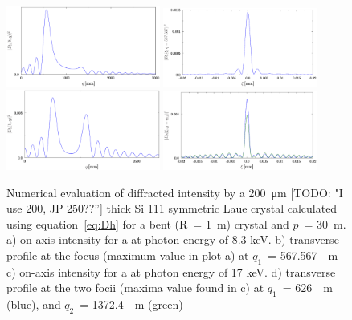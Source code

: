 \documentclass[preprint]{iucr}              %
\newcommand{\todo}[1]{{\color{red}[TODO: "#1'']}}
\newcommand{\inred}[1]{{\color{red}#1}}
\begin{document}
\begin{figure}
\label{fig:8keV}
\caption{Numerical evaluation of diffracted intensity by a \SI{200}{\micro\meter} \todo{I use 200, JP 250??} thick Si 111 symmetric Laue crystal calculated using equation~\ref{eq:Dh} for a bent (R~= \SI{1}{\meter}) crystal and $p$~= \SI{30}{\meter}. 
a) on-axis intensity for a at photon energy of 8.3 keV.
b) transverse profile at the focus (maximum value in plot a) at \inred{$q_1$~= \SI{567.567}{\mili\meter}}
c) on-axis intensity for a at photon energy of 17 keV.
d) transverse profile at the two focii (maxima value found in c) at $q_1$~= \SI{626}{\mili\meter} (blue), and $q_2$~= \SI{1372.4}{\mili\meter} (green)
}
\includegraphics[width=0.45\textwidth]{bent1m8keV.eps}
\includegraphics[width=0.45\textwidth]{bent1m8keV_profile.eps}
\includegraphics[width=0.45\textwidth]{bent1m17keV.eps}
\includegraphics[width=0.45\textwidth]{bent1m17keV_profile.eps}
\end{figure}


\end{document}
